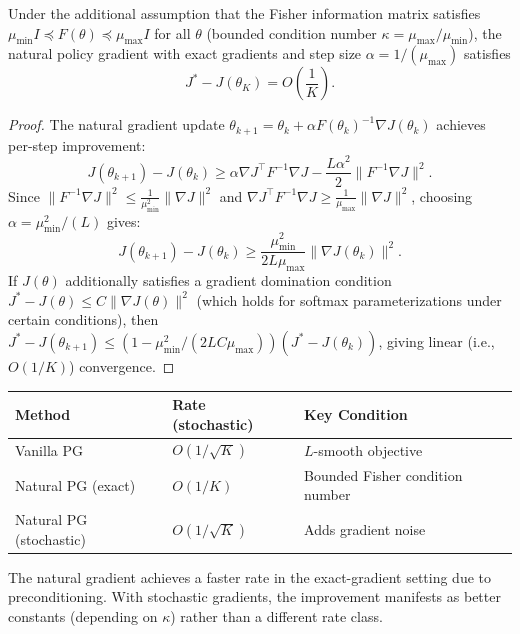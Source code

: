 \documentclass[11pt,a4paper]{article}
\begin{document}
\begin{theorem}
\label{thm:convergence-npg}
Under the additional assumption that the Fisher information matrix
satisfies $\mu_{\min} I \preceq F(\theta) \preceq \mu_{\max} I$
for all $\theta$ (bounded condition number $\kappa =
\mu_{\max}/\mu_{\min}$), the natural policy gradient with exact
gradients and step size $\alpha = 1/(\mu_{\max})$ satisfies
\[
  J^* - J(\theta_K) = O\!\left(\frac{1}{K}\right).
\]
\end{theorem}

\begin{proof}
The natural gradient update $\theta_{k+1} = \theta_k + \alpha
F(\theta_k)^{-1} \nabla J(\theta_k)$ achieves per-step improvement:
\[
  J(\theta_{k+1}) - J(\theta_k) \geq \alpha \nabla J^\top F^{-1}
  \nabla J - \frac{L\alpha^2}{2} \|F^{-1} \nabla J\|^2.
\]
Since $\|F^{-1} \nabla J\|^2 \leq \frac{1}{\mu_{\min}^2}
\|\nabla J\|^2$ and $\nabla J^\top F^{-1} \nabla J \geq
\frac{1}{\mu_{\max}} \|\nabla J\|^2$, choosing
$\alpha = \mu_{\min}^2 / (L)$ gives:
\[
  J(\theta_{k+1}) - J(\theta_k) \geq
  \frac{\mu_{\min}^2}{2L\mu_{\max}} \|\nabla J(\theta_k)\|^2.
\]
If $J(\theta)$ additionally satisfies a gradient domination condition
$J^* - J(\theta) \leq C \|\nabla J(\theta)\|^2$ (which holds for
softmax parameterizations under certain conditions), then
$J^* - J(\theta_{k+1}) \leq (1 - \mu_{\min}^2/(2LC\mu_{\max}))
(J^* - J(\theta_k))$, giving linear (i.e., $O(1/K)$) convergence.
\end{proof}

\begin{keyresult}[title={Convergence Rate Comparison}]
\begin{center}
\begin{tabular}{lll}
\toprule
\textbf{Method} & \textbf{Rate (stochastic)} & \textbf{Key Condition} \\
\midrule
Vanilla PG & $O(1/\sqrt{K})$ & $L$-smooth objective \\
Natural PG (exact) & $O(1/K)$ & Bounded Fisher condition number \\
Natural PG (stochastic) & $O(1/\sqrt{K})$ & Adds gradient noise \\
\bottomrule
\end{tabular}
\end{center}
The natural gradient achieves a faster rate in the exact-gradient setting
due to preconditioning. With stochastic gradients, the improvement
manifests as better constants (depending on $\kappa$) rather than a
different rate class.
\end{keyresult}
\end{document}
